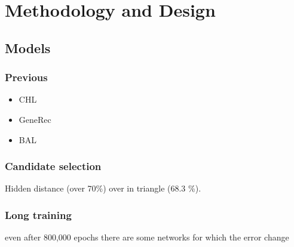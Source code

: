 
\section{Methodology and Design}

\subsection{Models}

\subsubsection{Previous} 

\begin{itemize} 
\item CHL
\item GeneRec 
\item BAL
\end{itemize}  

\subsubsection{Candidate selection} 
Hidden distance (over 70\%) over in triangle (68.3 \%). 


  
\subsubsection{Long training} 
even after 800,000 epochs there are some networks for which the error change

